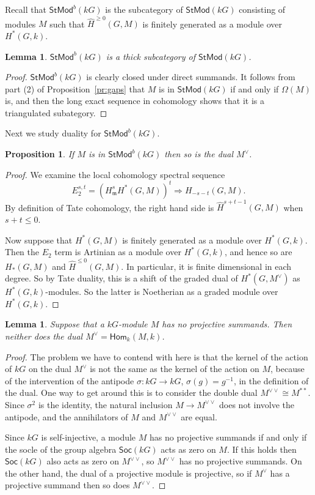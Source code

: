 \documentclass[12pt]{amsart}
\newcommand{\Hom}{\mathsf{Hom}}
\newcommand{\kG}{\kk G}
\newcommand{\kk}{k}
\newcommand{\Soc}{\mathsf{Soc}}
\newcommand{\StMod}{\mathsf{StMod}}
\newcommand{\fm}{\mathfrak{m}}
\renewcommand{\le}{\leqslant}
\renewcommand{\ge}{\geqslant}
\numberwithin{equation}{section}
\theoremstyle{plain}
\newtheorem{lemma}[equation]{Lemma}
\newtheorem{proposition}[equation]{Proposition}
\theoremstyle{definition}
\theoremstyle{remark}
\begin{document}
Recall that $\StMod^b(\kG)$ is the subcategory of $\StMod(\kG)$
consisting of modules $M$ such that $\hat H^{\ge 0}(G,M)$ is finitely generated
as a module over $H^*(G,\kk)$. 

\begin{lemma}
$\StMod^b(\kG)$ is a thick subcategory of $\StMod(\kG)$.
\end{lemma}
\begin{proof}
$\StMod^b(\kG)$ is clearly closed under direct summands.
It follows from part (2) of Proposition~\ref{pr:gaps} that $M$ is in
$\StMod(kG)$ if and only if $\Omega(M)$ is, and then the long exact
sequence in cohomology shows that it is a triangulated subategory.
\end{proof}

Next we study duality for $\StMod^b(\kG)$.

\begin{proposition}\label{pr:dual}
If $M$ is in $\StMod^b(\kG)$ then so is the dual $M^\vee$.
\end{proposition}
\begin{proof}
We examine the local cohomology spectral
sequence~\cite{Greenlees:1995a}
\[ E_2^{s,t}=(H^{s}_\fm H^*(G,M))^t \Rightarrow H_{-s-t}(G,M). \]
By definition of Tate cohomology, the right hand side is
$\hat H^{s+t-1}(G,M)$ when $s+t\le 0$. 

Now suppose that $H^*(G,M)$ is finitely generated as a module over
$H^*(G,\kk)$. Then the $E_2$ term is Artinian as a module over
$H^*(G,\kk)$, and hence so are $H_*(G,M)$ and $\hat H^{\le 0}(G,M)$. In particular, it is finite
dimensional in each degree. So
by Tate duality, this is a shift of the graded dual 
of $H^*(G,M^\vee)$ as $H^*(G,\kk)$-modules. So the latter is
Noetherian as a graded module over $H^*(G,\kk)$.
\end{proof}

\begin{lemma}\label{le:dual}
Suppose that a $\kG$-module $M$ has no projective summands. 
Then neither does the dual $M^\vee=\Hom_k(M,k)$.
\end{lemma}
\begin{proof}
The problem we have to contend with here is that the kernel of the
action of $\kG$ on the dual $M^\vee$ is not the same as the kernel of
the action on $M$, because of the intervention of the antipode
$\sigma\colon\kG\to\kG$, $\sigma(g)=g^{-1}$, in the definition of the
dual. One way to get around this is to consider the double dual
$M^{\vee\vee}\cong M^{**}$. Since $\sigma^2$ is the identity, the
natural inclusion $M \to M^{\vee\vee}$ does not involve the antipode, and
the annihilators of $M$ and $M^{\vee\vee}$ are equal.

Since $kG$ is self-injective, a module $M$ has no projective summands
if and only if the socle of the group algebra $\Soc(\kG)$ acts as zero
on $M$. If this holds then $\Soc(\kG)$ also acts as zero on
$M^{\vee\vee}$, so $M^{\vee\vee}$ has no projective summands. On the
other hand, the dual of a projective module is projective, so if
$M^\vee$ has a projective summand then so does $M^{\vee\vee}$.
\end{proof}
\end{document}
